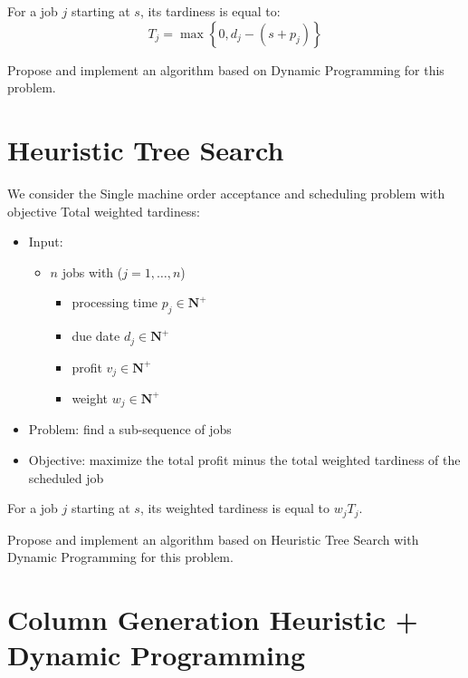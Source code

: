 \documentclass[a4paper]{article}
\newcommand{\N}{\mathbf{N}}
\begin{document}
For a job $j$ starting at $s$, its tardiness is equal to:
\begin{displaymath}
  T_j = \max \left\{ 0, d_j - (s + p_j) \right\}
\end{displaymath}

Propose and implement an algorithm based on Dynamic Programming for this problem.

\section{Heuristic Tree Search}

We consider the Single machine order acceptance and scheduling problem with objective Total weighted tardiness:
\begin{itemize}
  \item Input:
    \begin{itemize}
      \item $n$ jobs with ($j = 1, \dots, n$)
        \begin{itemize}
          \item processing time $p_j \in \N^+$
          \item due date $d_j \in \N^+$
          \item profit $v_j \in \N^+$
          \item weight $w_j \in \N^+$
        \end{itemize}
    \end{itemize}
  \item Problem: find a sub-sequence of jobs
  \item Objective: maximize the total profit minus the total weighted tardiness of the scheduled job
\end{itemize}

For a job $j$ starting at $s$, its weighted tardiness is equal to $w_j T_j$.

Propose and implement an algorithm based on Heuristic Tree Search with Dynamic Programming for this problem.

\section{Column Generation Heuristic + Dynamic Programming}
\end{document}
